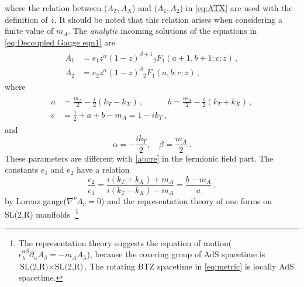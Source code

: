 \documentclass[11pt,a4paper]{article}
\newcommand\CW[1]{\textcolor{red}{\bf [CW:\,#1]}}
\begin{document}
where the relation between ($A_T,A_X$) and ($A_1,A_2$) in \eqref{eq:ATX} are used with the definition of $z$.
It should be noted that this relation arises when considering a finite value of $m_A$.
The \textit{analytic} incoming solutions of the equations in \eqref{eq:Decoupled Gauge eqn1} are
\begin{align}\label{eq:A12Sol}
\begin{split}
    A_1 &= e_1 z^{\alpha} (1-z)^{\beta + 1} {}_2 F_{1}(a+1, b+1; c; z)\,, \\
    A_2 &= e_2 z^{\alpha} (1-z)^{\beta} {}_2 F_{1}(a, b; c; z)\,,
\end{split}
\end{align}
where
\begin{align}\label{abcre Gauge}
\begin{split}
    a &=\frac{m_A}{2}-\frac{i}{2}(k_T - k_X)\,, \quad \qquad b =\frac{m_A}{2}-\frac{i}{2}(k_T + k_X)\,, \\
    c &= \frac{1}{2}+a+b-m_A = 1-i k_T\,,
\end{split}
\end{align}
and
\begin{equation}
    \alpha=- \frac{i k_T}{2}, \quad \beta=\frac{m_A}{2}\,.
\end{equation}
These parameters are different with \eqref{abcre} in the fermionic field part. The constants $e_1$ and $e_2$ have a relation
\begin{equation} \label{eq:e1e2 relation}
    \frac{e_2}{e_1} = \frac{i(k_T + k_X) + m_A}{i(k_T - k_X) - m_A} = \frac{b-m_A}{a}\,,
\end{equation}
by Lorenz gauge($\nabla^\nu A_\nu =0$) and the representation theory of one forms on SL(2,R) manifolds \cite{Das:1999pt, Birmingham:2001pj}.\footnote{
The representation theory suggests the equation of motion($\epsilon_\lambda^{\alpha \beta}\partial_\alpha A_\beta = - m_A A_{\lambda}$), because the covering group of AdS spacetime is $\text{SL(2,R)}\times\text{SL(2,R)}$. The rotating BTZ spacetime in \eqref{eq:metric} is locally AdS spacetime.
}

\end{document}
